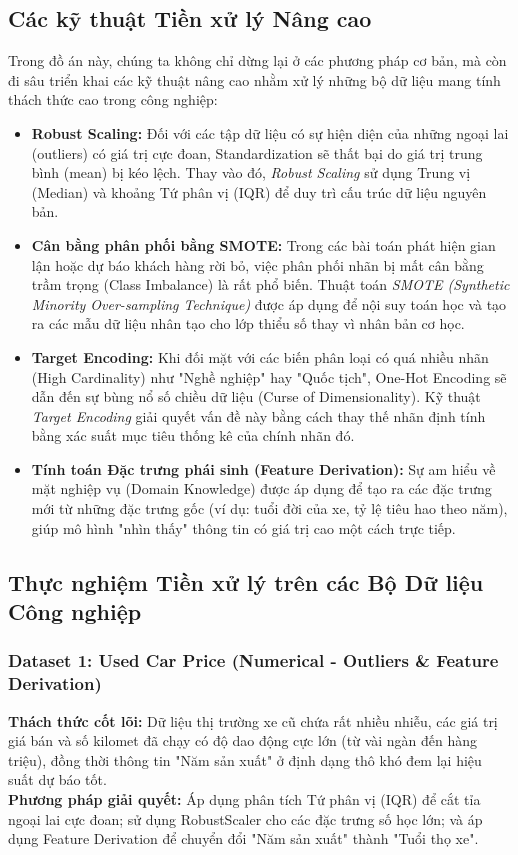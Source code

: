 \subsection{Các kỹ thuật Tiền xử lý Nâng cao}
Trong đồ án này, chúng ta không chỉ dừng lại ở các phương pháp cơ bản, mà còn đi sâu triển khai các kỹ thuật nâng cao nhằm xử lý những bộ dữ liệu mang tính thách thức cao trong công nghiệp:
\begin{itemize}
    \item \textbf{Robust Scaling:} Đối với các tập dữ liệu có sự hiện diện của những ngoại lai (outliers) có giá trị cực đoan, Standardization sẽ thất bại do giá trị trung bình (mean) bị kéo lệch. Thay vào đó, \textit{Robust Scaling} sử dụng Trung vị (Median) và khoảng Tứ phân vị (IQR) để duy trì cấu trúc dữ liệu nguyên bản.
    \item \textbf{Cân bằng phân phối bằng SMOTE:} Trong các bài toán phát hiện gian lận hoặc dự báo khách hàng rời bỏ, việc phân phối nhãn bị mất cân bằng trầm trọng (Class Imbalance) là rất phổ biến. Thuật toán \textit{SMOTE (Synthetic Minority Over-sampling Technique)} được áp dụng để nội suy toán học và tạo ra các mẫu dữ liệu nhân tạo cho lớp thiểu số thay vì nhân bản cơ học.
    \item \textbf{Target Encoding:} Khi đối mặt với các biến phân loại có quá nhiều nhãn (High Cardinality) như "Nghề nghiệp" hay "Quốc tịch", One-Hot Encoding sẽ dẫn đến sự bùng nổ số chiều dữ liệu (Curse of Dimensionality). Kỹ thuật \textit{Target Encoding} giải quyết vấn đề này bằng cách thay thế nhãn định tính bằng xác suất mục tiêu thống kê của chính nhãn đó.
    \item \textbf{Tính toán Đặc trưng phái sinh (Feature Derivation):} Sự am hiểu về mặt nghiệp vụ (Domain Knowledge) được áp dụng để tạo ra các đặc trưng mới từ những đặc trưng gốc (ví dụ: tuổi đời của xe, tỷ lệ tiêu hao theo năm), giúp mô hình "nhìn thấy" thông tin có giá trị cao một cách trực tiếp.
\end{itemize}

\subsection{Thực nghiệm Tiền xử lý trên các Bộ Dữ liệu Công nghiệp}

\subsubsection{Dataset 1: Used Car Price (Numerical - Outliers \& Feature Derivation)}
\textbf{Thách thức cốt lõi:} Dữ liệu thị trường xe cũ chứa rất nhiều nhiễu, các giá trị giá bán và số kilomet đã chạy có độ dao động cực lớn (từ vài ngàn đến hàng triệu), đồng thời thông tin "Năm sản xuất" ở định dạng thô khó đem lại hiệu suất dự báo tốt. \\
\textbf{Phương pháp giải quyết:} Áp dụng phân tích Tứ phân vị (IQR) để cắt tỉa ngoại lai cực đoan; sử dụng RobustScaler cho các đặc trưng số học lớn; và áp dụng Feature Derivation để chuyển đổi "Năm sản xuất" thành "Tuổi thọ xe".


